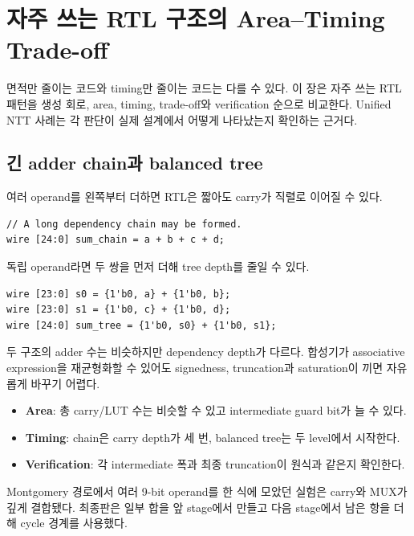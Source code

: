 \chapter{자주 쓰는 RTL 구조의 Area--Timing Trade-off}

\begin{summarybox}
면적만 줄이는 코드와 timing만 줄이는 코드는 다를 수 있다. 이 장은 자주 쓰는
RTL 패턴을 생성 회로, area, timing, trade-off와 verification 순으로 비교한다.
Unified NTT 사례는 각 판단이 실제 설계에서 어떻게 나타났는지 확인하는 근거다.
\end{summarybox}

\section{긴 adder chain과 balanced tree}

여러 operand를 왼쪽부터 더하면 RTL은 짧아도 carry가 직렬로 이어질 수 있다.

\begin{lstlisting}
// A long dependency chain may be formed.
wire [24:0] sum_chain = a + b + c + d;
\end{lstlisting}

독립 operand라면 두 쌍을 먼저 더해 tree depth를 줄일 수 있다.

\begin{lstlisting}
wire [23:0] s0 = {1'b0, a} + {1'b0, b};
wire [23:0] s1 = {1'b0, c} + {1'b0, d};
wire [24:0] sum_tree = {1'b0, s0} + {1'b0, s1};
\end{lstlisting}

두 구조의 adder 수는 비슷하지만 dependency depth가 다르다. 합성기가 associative
expression을 재균형화할 수 있어도 signedness, truncation과 saturation이 끼면
자유롭게 바꾸기 어렵다.

\begin{itemize}
  \item \textbf{Area}: 총 carry/LUT 수는 비슷할 수 있고 intermediate guard bit가 늘 수 있다.
  \item \textbf{Timing}: chain은 carry depth가 세 번, balanced tree는 두 level에서 시작한다.
  \item \textbf{Verification}: 각 intermediate 폭과 최종 truncation이 원식과 같은지 확인한다.
\end{itemize}

Montgomery 경로에서 여러 9-bit operand를 한 식에 모았던 실험은 carry와 MUX가
깊게 결합됐다. 최종판은 일부 합을 앞 stage에서 만들고 다음 stage에서 남은 항을
더해 cycle 경계를 사용했다.

